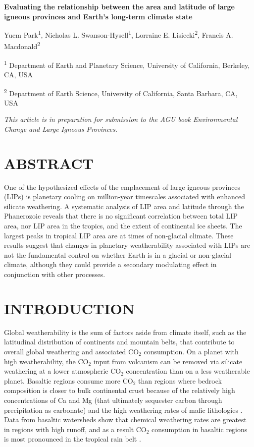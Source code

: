 \documentclass[11pt,letterpaper]{article}
\begin{document}
\begin{flushleft}
{\Large \textbf{Evaluating the relationship between the area and latitude of large igneous provinces and Earth's long-term climate state}}

Yuem Park\textsuperscript{1},
Nicholas L. Swanson-Hysell\textsuperscript{1},
Lorraine E. Lisiecki\textsuperscript{2},
Francis A. Macdonald\textsuperscript{2}

\bigskip
\textsuperscript{1} Department of Earth and Planetary Science, University of California, Berkeley, CA, USA

\textsuperscript{2} Department of Earth Science, University of California, Santa Barbara, CA, USA
\bigskip

\end{flushleft}

\noindent\textit{This article is in preparation for submission to the AGU book \textit{Environmental Change and Large Igneous Provinces}.}

\linenumbers

\section*{ABSTRACT \label{sec:ABSTRACT}}

One of the hypothesized effects of the emplacement of large igneous provinces (LIPs) is planetary cooling on million-year timescales associated with enhanced silicate weathering. A systematic analysis of LIP area and latitude through the Phanerozoic reveals that there is no significant correlation between total LIP area, nor LIP area in the tropics, and the extent of continental ice sheets. The largest peaks in tropical LIP area are at times of non-glacial climate. These results suggest that changes in planetary weatherability associated with LIPs are not the fundamental control on whether Earth is in a glacial or non-glacial climate, although they could provide a secondary modulating effect in conjunction with other processes.

\section*{INTRODUCTION \label{sec:INTRODUCTION}}

Global weatherability is the sum of factors aside from climate itself, such as the latitudinal distribution of continents and mountain belts, that contribute to overall global weathering and associated CO$_2$ consumption. On a planet with high weatherability, the CO$_2$ input from volcanism can be removed via silicate weathering at a lower atmospheric CO$_2$ concentration than on a less weatherable planet. Basaltic regions consume more CO$_2$ than regions where bedrock composition is closer to bulk continental crust because of the relatively high concentrations of Ca and Mg (that ultimately sequester carbon through precipitation as carbonate) and the high weathering rates of mafic lithologies \citep{Dessert2003a}. Data from basaltic watersheds show that chemical weathering rates are greatest in regions with high runoff, and as a result CO$_2$ consumption in basaltic regions is most pronounced in the tropical rain belt \citep{Dessert2003a, Hartmann2009a, Hartmann2014a}.
\end{document}
